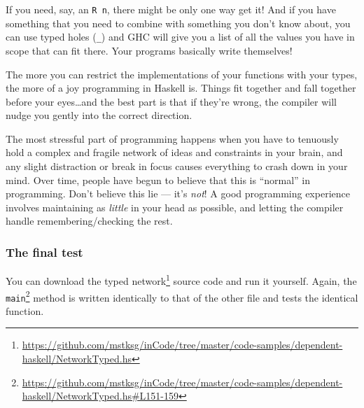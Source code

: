 \documentclass[]{article}
\newenvironment{Shaded}{}{}
\newcommand{\CommentTok}[1]{\textcolor[rgb]{0.38,0.63,0.69}{\textit{#1}}}
\newcommand{\ExtensionTok}[1]{#1}
\newcommand{\NormalTok}[1]{#1}
\renewcommand{\href}[2]{#2\footnote{\url{#1}}}
\begin{document}
If you need, say, an \texttt{R\ n}, there might be only one way get it! And if
you have something that you need to combine with something you don't know about,
you can use typed holes (\texttt{\_}) and GHC will give you a list of all the
values you have in scope that can fit there. Your programs basically write
themselves!

The more you can restrict the implementations of your functions with your types,
the more of a joy programming in Haskell is. Things fit together and fall
together before your eyes\ldots{}and the best part is that if they're wrong, the
compiler will nudge you gently into the correct direction.

The most stressful part of programming happens when you have to tenuously hold a
complex and fragile network of ideas and constraints in your brain, and any
slight distraction or break in focus causes everything to crash down in your
mind. Over time, people have begun to believe that this is ``normal'' in
programming. Don't believe this lie --- it's \emph{not}! A good programming
experience involves maintaining as \emph{little} in your head as possible, and
letting the compiler handle remembering/checking the rest.

\subsubsection{The final test}\label{the-final-test}

You can download the
\href{https://github.com/mstksg/inCode/tree/master/code-samples/dependent-haskell/NetworkTyped.hs}{typed
network} source code and run it yourself. Again, the
\href{https://github.com/mstksg/inCode/tree/master/code-samples/dependent-haskell/NetworkTyped.hs\#L151-159}{\texttt{main}}
method is written identically to that of the other file and tests the identical
function.

\begin{Shaded}
\end{Shaded}
\end{document}
